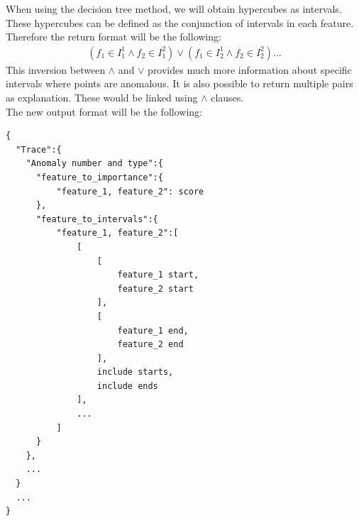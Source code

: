 \documentclass[oneside, a4paper, onecolumn, 11pt]{article}
\begin{document}
When using the decision tree method, we will obtain hypercubes as intervals. These hypercubes can be defined as the conjunction of intervals in each feature. Therefore the return format will be the following: 
\begin{align*}
  (f_1 \in I^1_1 \land f_2 \in I^2_1) \lor (f_1 \in I^1_2 \land f_2 \in I^2_2) ...
\end{align*}
This inversion between $\land$ and $\lor$ provides much more information about specific intervals where points are anomalous. It is also possible to return multiple pairs as explanation. These would be linked using $\land$ clauses.\\
The new output format will be the following:
\begin{verbatim}
{
  "Trace":{
    "Anomaly number and type":{
      "feature_to_importance":{
          "feature_1, feature_2": score
      },
      "feature_to_intervals":{
          "feature_1, feature_2":[
              [
                  [
                      feature_1 start,
                      feature_2 start
                  ],
                  [
                      feature_1 end,
                      feature_2 end
                  ],
                  include starts,
                  include ends
              ],
              ...
          ]
      }
    },
    ...
  }
  ...
}
\end{verbatim}
\end{document}
